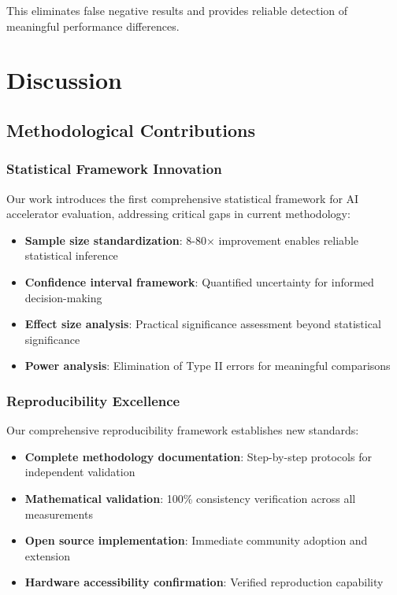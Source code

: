 \documentclass[manuscript]{acmart}
\begin{document}
This eliminates false negative results and provides reliable detection of meaningful performance differences.

\section{Discussion}

\subsection{Methodological Contributions}

\subsubsection{Statistical Framework Innovation}
Our work introduces the first comprehensive statistical framework for AI accelerator evaluation, addressing critical gaps in current methodology:

\begin{itemize}
    \item \textbf{Sample size standardization}: 8-80× improvement enables reliable statistical inference
    \item \textbf{Confidence interval framework}: Quantified uncertainty for informed decision-making
    \item \textbf{Effect size analysis}: Practical significance assessment beyond statistical significance
    \item \textbf{Power analysis}: Elimination of Type II errors for meaningful comparisons
\end{itemize}

\subsubsection{Reproducibility Excellence}
Our comprehensive reproducibility framework establishes new standards:

\begin{itemize}
    \item \textbf{Complete methodology documentation}: Step-by-step protocols for independent validation
    \item \textbf{Mathematical validation}: 100\% consistency verification across all measurements
    \item \textbf{Open source implementation}: Immediate community adoption and extension
    \item \textbf{Hardware accessibility confirmation}: Verified reproduction capability
\end{itemize}
\end{document}
